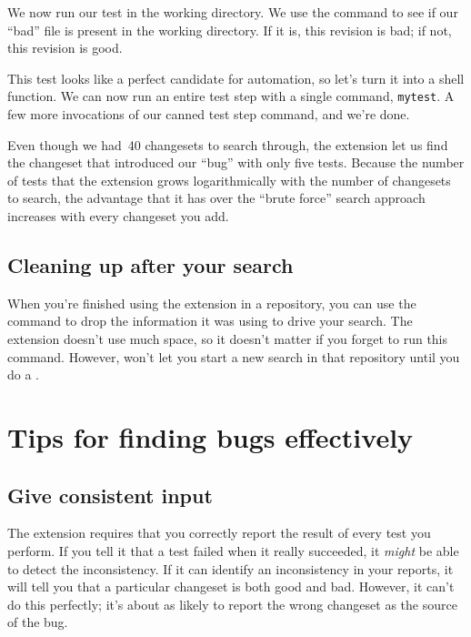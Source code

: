 We now run our test in the working directory.  We use the
 command to see if our ``bad'' file is present in the
working directory.  If it is, this revision is bad; if not, this
revision is good.

This test looks like a perfect candidate for automation, so let's turn
it into a shell function.
We can now run an entire test step with a single command,
\texttt{mytest}.
A few more invocations of our canned test step command, and we're
done.

Even though we had~40 changesets to search through, the 
extension let us find the changeset that introduced our ``bug'' with
only five tests.  Because the number of tests that the 
extension grows logarithmically with the number of changesets to
search, the advantage that it has over the ``brute force'' search
approach increases with every changeset you add.

\subsection{Cleaning up after your search}

When you're finished using the  extension in a
repository, you can use the  command to drop
the information it was using to drive your search.  The extension
doesn't use much space, so it doesn't matter if you forget to run this
command.  However,  won't let you start a new search in
that repository until you do a .

\section{Tips for finding bugs effectively}

\subsection{Give consistent input}

The  extension requires that you correctly report the
result of every test you perform.  If you tell it that a test failed
when it really succeeded, it \emph{might} be able to detect the
inconsistency.  If it can identify an inconsistency in your reports,
it will tell you that a particular changeset is both good and bad.
However, it can't do this perfectly; it's about as likely to report
the wrong changeset as the source of the bug.

